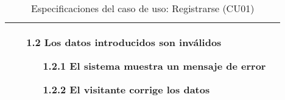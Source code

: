 \begin{table}[h]
\begin{tabular}{|m{3cm}|m{11cm}|}
\begin{enumerate}[noitemsep]
\begin{enumerate}[noitemsep]
            \end{enumerate}
            \item[1.2] Los datos introducidos son inválidos
            \begin{enumerate}[noitemsep]
                \item[1.2.1] El sistema muestra un mensaje de error
                \item[1.2.2] El visitante corrige los datos
            \end{enumerate}
        \end{enumerate} \\
        \hline
    \end{tabular}
    \caption{Especificaciones del caso de uso: Registrarse (CU01)}
\end{table}
